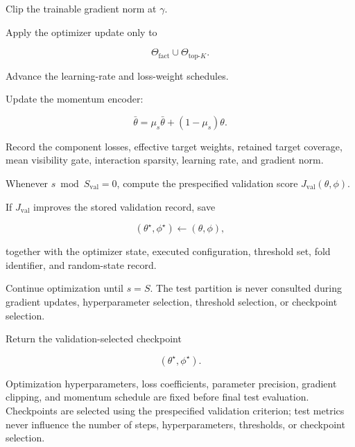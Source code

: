 \begin{tcolorbox}
\begin{algsteps}
\item
Clip the trainable gradient norm at \(\gamma\).

\item
Apply the optimizer update only to

\[
\Theta_{\mathrm{fact}}
\cup
\Theta_{\mathrm{top}\text{-}K}.
\]

\item
Advance the learning-rate and loss-weight schedules.

\item
Update the momentum encoder:

\[
\bar\theta
=
\mu_s\bar\theta
+
(1-\mu_s)\theta.
\]

\item
Record the component losses, effective target weights, retained target
coverage, mean visibility gate, interaction sparsity, learning rate,
and gradient norm.


\item
Whenever \(s\bmod S_{\mathrm{val}}=0\), compute the prespecified
validation score \(J_{\mathrm{val}}(\theta,\phi)\).

\item
If \(J_{\mathrm{val}}\) improves the stored validation record, save

\[
(\theta^\star,\phi^\star)
\gets
(\theta,\phi),
\]

together with the optimizer state, executed configuration, threshold
set, fold identifier, and random-state record.

\item
Continue optimization until \(s=S\). The test partition is never
consulted during gradient updates, hyperparameter selection, threshold
selection, or checkpoint selection.


\item
Return the validation-selected checkpoint

\[
(\theta^\star,\phi^\star).
\]

\end{algsteps}
\end{tcolorbox}

Optimization hyperparameters, loss coefficients, parameter precision,
gradient clipping, and momentum schedule are fixed before final test
evaluation. Checkpoints are selected using the prespecified validation
criterion; test metrics never influence the number of steps,
hyperparameters, thresholds, or checkpoint selection.


